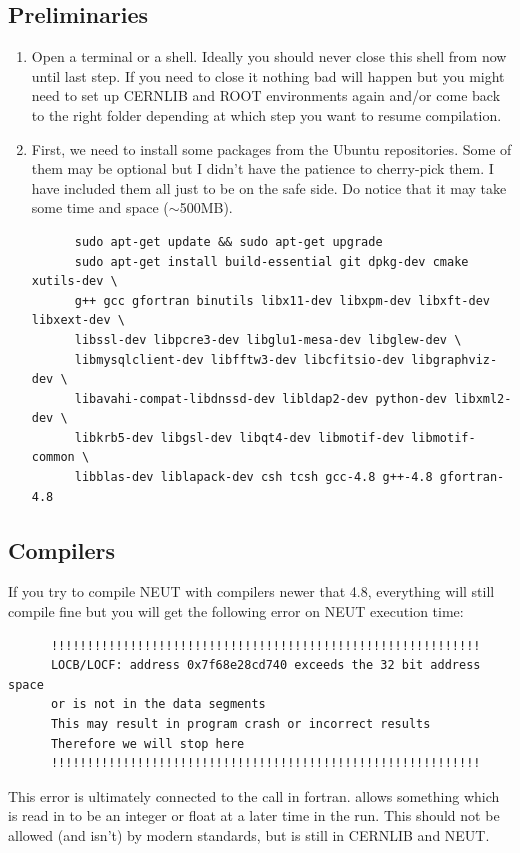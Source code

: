 \subsection{Preliminaries}
\begin{enumerate}
\item Open a terminal or a shell. Ideally you should never close this
  shell from now until last step. If you need to close it nothing bad
  will happen but you might need to set up CERNLIB and ROOT
  environments again and/or come back to the right folder depending at
  which step you want to resume compilation.
\item\label{packages} First, we need to install some packages from the Ubuntu
  repositories. Some of them may be optional but I didn't have the
  patience to cherry-pick them. I have included them all just to be on
  the safe side. Do notice that it may take some time and space
  ($\sim$500MB).
\begin{lstlisting}
      sudo apt-get update && sudo apt-get upgrade
      sudo apt-get install build-essential git dpkg-dev cmake xutils-dev \
      g++ gcc gfortran binutils libx11-dev libxpm-dev libxft-dev libxext-dev \
      libssl-dev libpcre3-dev libglu1-mesa-dev libglew-dev \
      libmysqlclient-dev libfftw3-dev libcfitsio-dev libgraphviz-dev \
      libavahi-compat-libdnssd-dev libldap2-dev python-dev libxml2-dev \
      libkrb5-dev libgsl-dev libqt4-dev libmotif-dev libmotif-common \
      libblas-dev liblapack-dev csh tcsh gcc-4.8 g++-4.8 gfortran-4.8
\end{lstlisting}
\end{enumerate}

\subsection{Compilers}\label{compiler}
If you try to compile NEUT with compilers newer that 4.8, everything
will still compile fine but you will get the
following error on NEUT execution time:
\begin{lstlisting}
      !!!!!!!!!!!!!!!!!!!!!!!!!!!!!!!!!!!!!!!!!!!!!!!!!!!!!!!!!!!!
      LOCB/LOCF: address 0x7f68e28cd740 exceeds the 32 bit address space
      or is not in the data segments
      This may result in program crash or incorrect results
      Therefore we will stop here
      !!!!!!!!!!!!!!!!!!!!!!!!!!!!!!!!!!!!!!!!!!!!!!!!!!!!!!!!!!!!
\end{lstlisting}
This error is ultimately connected to the \cleanstyle{FFKEY} call in
fortran. \cleanstyle{FFKEY} allows something which is read in to 
be an integer or float at a later time in the run. This should not 
be allowed (and isn't) by modern standards, but is still in CERNLIB
and NEUT.\@ 

